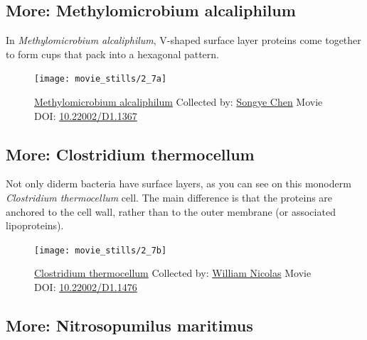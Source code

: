 \documentclass[]{tufte-book}
\begin{document}
\hypertarget{Methylomicrobium_alcaliphilum}{\subsection*{More:
Methylomicrobium alcaliphilum}\label{Methylomicrobium_alcaliphilum}}

In \emph{Methylomicrobium alcaliphilum}, V-shaped surface layer proteins
come together to form cups that pack into a hexagonal pattern.





\begin{figure}
\texttt{[image: movie\_stills/2\_7a]} \caption[\protect\hyperlink{tree}{Methylomicrobium alcaliphilum}
Collected by: \protect\hyperlink{songye_chen}{Songye Chen} Movie DOI:
\href{https://doi.org/10.22002/D1.1367}{10.22002/D1.1367}]{\protect\hyperlink{tree}{Methylomicrobium alcaliphilum}
Collected by: \protect\hyperlink{songye_chen}{Songye Chen} Movie DOI:
\href{https://doi.org/10.22002/D1.1367}{10.22002/D1.1367}}\label{fig:2-7a}
\end{figure}

\hypertarget{Clostridium_thermocellum}{\subsection*{More: Clostridium
thermocellum}\label{Clostridium_thermocellum}}

Not only diderm bacteria have surface layers, as you can see on this
monoderm \emph{Clostridium thermocellum} cell. The main difference is
that the proteins are anchored to the cell wall, rather than to the
outer membrane (or associated lipoproteins).





\begin{figure}
\texttt{[image: movie\_stills/2\_7b]} \caption[\protect\hyperlink{tree}{Clostridium thermocellum} Collected
by: \protect\hyperlink{william_nicolas}{William Nicolas} Movie DOI:
\href{https://doi.org/10.22002/D1.1476}{10.22002/D1.1476}]{\protect\hyperlink{tree}{Clostridium thermocellum} Collected
by: \protect\hyperlink{william_nicolas}{William Nicolas} Movie DOI:
\href{https://doi.org/10.22002/D1.1476}{10.22002/D1.1476}}\label{fig:2-7b}
\end{figure}

\hypertarget{Nitrosopumilus_maritimus}{\subsection*{More: Nitrosopumilus
maritimus}\label{Nitrosopumilus_maritimus}}
\end{document}

